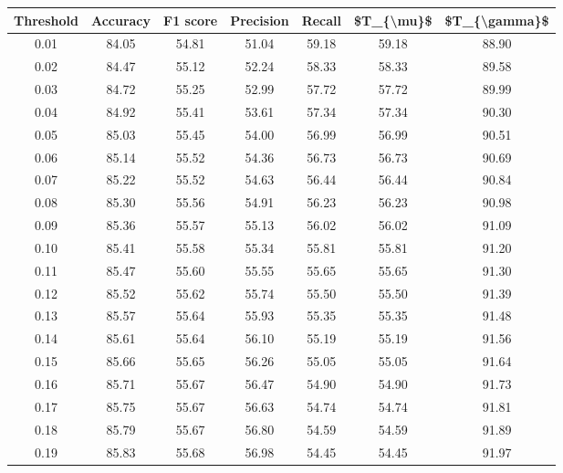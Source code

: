 \begin{tabular}{|c|c|c|c|c|c|c|}
\hline
 Threshold &  Accuracy &  F1 score &  Precision &  Recall &  \$T\_\{\textbackslash mu\}\$ &  \$T\_\{\textbackslash gamma\}\$ \\
\hline
      0.01 &     84.05 &     54.81 &      51.04 &   59.18 &      59.18 &         88.90 \\
      0.02 &     84.47 &     55.12 &      52.24 &   58.33 &      58.33 &         89.58 \\
      0.03 &     84.72 &     55.25 &      52.99 &   57.72 &      57.72 &         89.99 \\
      0.04 &     84.92 &     55.41 &      53.61 &   57.34 &      57.34 &         90.30 \\
      0.05 &     85.03 &     55.45 &      54.00 &   56.99 &      56.99 &         90.51 \\
      0.06 &     85.14 &     55.52 &      54.36 &   56.73 &      56.73 &         90.69 \\
      0.07 &     85.22 &     55.52 &      54.63 &   56.44 &      56.44 &         90.84 \\
      0.08 &     85.30 &     55.56 &      54.91 &   56.23 &      56.23 &         90.98 \\
      0.09 &     85.36 &     55.57 &      55.13 &   56.02 &      56.02 &         91.09 \\
      0.10 &     85.41 &     55.58 &      55.34 &   55.81 &      55.81 &         91.20 \\
      0.11 &     85.47 &     55.60 &      55.55 &   55.65 &      55.65 &         91.30 \\
      0.12 &     85.52 &     55.62 &      55.74 &   55.50 &      55.50 &         91.39 \\
      0.13 &     85.57 &     55.64 &      55.93 &   55.35 &      55.35 &         91.48 \\
      0.14 &     85.61 &     55.64 &      56.10 &   55.19 &      55.19 &         91.56 \\
      0.15 &     85.66 &     55.65 &      56.26 &   55.05 &      55.05 &         91.64 \\
      0.16 &     85.71 &     55.67 &      56.47 &   54.90 &      54.90 &         91.73 \\
      0.17 &     85.75 &     55.67 &      56.63 &   54.74 &      54.74 &         91.81 \\
      0.18 &     85.79 &     55.67 &      56.80 &   54.59 &      54.59 &         91.89 \\
      0.19 &     85.83 &     55.68 &      56.98 &   54.45 &      54.45 &         91.97 \\

\end{tabular}

